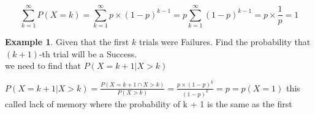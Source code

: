 \documentclass[12pt]{article}
\theoremstyle{definition}
\newtheorem{exmp}{Example}[section]
\begin{document}
\begin{equation}
    \displaystyle \sum_{k = 1}^{\infty}   P(X = k) = \sum_{k = 1}^{\infty}p \times (1 - p)^{k-1}
    = p\sum_{k = 1}^{\infty}(1 - p)^{k-1} = p \times \frac{1}{p} = 1
\end{equation}    
\begin{exmp}
    Given that the first $k$ trials were Failures. Find the probability that $(k+1)$-th trial will be a Success. \\

    we need to find that $P(X = k + 1 | X > k)$
    \begin{center}
        $ \displaystyle  P(X = k + 1 | X > k) = \frac{P(X=k+1 \cap X>k)}{P(X>k)}
        = \frac{p \times (1-p)^k}{(1-p)^k} = p = p(X = 1)$  this called lack of memory where the probability
        of k + 1 is the same as the first
\end{center}
\end{exmp}    
\end{document}
